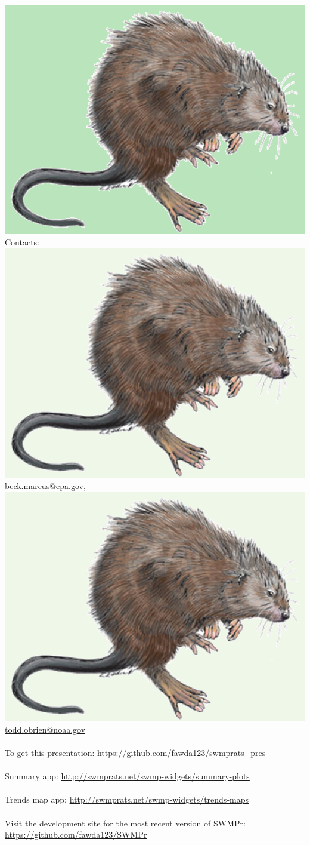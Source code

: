 \documentclass[serif]{beamer}\usepackage[]{graphicx}\usepackage[]{color}
\begin{document}
\begin{frame}[fragile]{\includegraphics[width=0.05\paperwidth]{fig/muskrat.png}\hspace{0.07in}{\bf Continuing work and engagement}}
Contacts: \includegraphics[width=0.05\paperwidth]{fig/muskrat2.png}\hspace{0.05in}\href{mailto:beck.marcus@epa.gov}{beck.marcus@epa.gov}, \includegraphics[width=0.05\paperwidth]{fig/muskrat2.png}\hspace{0.05in}\href{mailto:todd.obrien@noaa.gov}{todd.obrien@noaa.gov} \\~\\
To get this presentation: \href{https://github.com/fawda123/swmprats_pres}{https://github.com/fawda123/swmprats\_pres} \\~\\
Summary app: \href{http://swmprats.net/swmp-widgets/summary-plots}{http://swmprats.net/swmp-widgets/summary-plots} \\~\\
Trends map app: \href{http://swmprats.net/swmp-widgets/trends-maps}{http://swmprats.net/swmp-widgets/trends-maps} \\~\\
Visit the development site for the most recent version of SWMPr: \href{https://github.com/fawda123/SWMPr}{https://github.com/fawda123/SWMPr}\\~\\
\end{frame}
\end{document}

